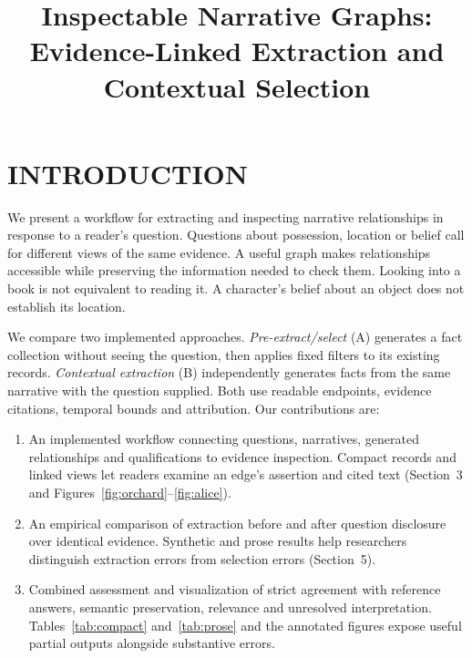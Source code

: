 \documentclass[a4paper,twoside]{article}
\begin{document}
\title{Inspectable Narrative Graphs: Evidence-Linked Extraction and Contextual Selection}
\author{}

\onecolumn\maketitle\normalsize\setcounter{footnote}{0}\vfill

\section{\uppercase{Introduction}}
\noindent We present a workflow for extracting and inspecting narrative relationships in response to a reader's question. Questions about possession, location or belief call for different views of the same evidence. A useful graph makes relationships accessible while preserving the information needed to check them. Looking into a book is not equivalent to reading it. A character's belief about an object does not establish its location.

We compare two implemented approaches. \emph{Pre-extract/select} (A) generates a fact collection without seeing the question, then applies fixed filters to its existing records. \emph{Contextual extraction} (B) independently generates facts from the same narrative with the question supplied. Both use readable endpoints, evidence citations, temporal bounds and attribution. Our contributions are:

\begin{enumerate}
\item An implemented workflow connecting questions, narratives, generated relationships and qualifications to evidence inspection. Compact records and linked views let readers examine an edge's assertion and cited text (Section~3 and Figures~\ref{fig:orchard}--\ref{fig:alice}).
\item An empirical comparison of extraction before and after question disclosure over identical evidence. Synthetic and prose results help researchers distinguish extraction errors from selection errors (Section~5).
\item Combined assessment and visualization of strict agreement with reference answers, semantic preservation, relevance and unresolved interpretation. Tables~\ref{tab:compact} and~\ref{tab:prose} and the annotated figures expose useful partial outputs alongside substantive errors.
\end{enumerate}
\end{document}

